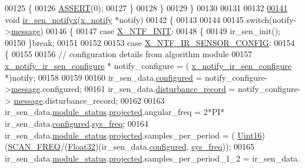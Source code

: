 \begin{DoxyCode}
00125         \{
00126             \hyperlink{a00072_abb8ff8e213ac9f6fb21d2b968583b936}{ASSERT}(0);
00127         \}
00128     \}
00129 \}
00130 
00131 
00132 
\hypertarget{a00045_source_l00141}{}\hyperlink{a00045_a36c6c2cdf9aa5844371e742330789dad}{00141} \textcolor{keywordtype}{void} \hyperlink{a00045_a36c6c2cdf9aa5844371e742330789dad}{ir\_sen\_notifyx}(\hyperlink{a00036_df/d4c/a00851}{x\_notify} *notify)
00142 \{
00143 
00144 
00145     \textcolor{keywordflow}{switch}(notify->\hyperlink{a00036_adf9665938515a20c283eea2c978cf80d}{message})
00146     \{
00147         \textcolor{keywordflow}{case} \hyperlink{a00036_a620b808f2d7b8d2a03c4d026a4c5423c}{X\_NTF\_INIT}:
00148         \{
00149             ir\_sen\_init();
00150         \}\textcolor{keywordflow}{break};
00151 
00152 
00153         \textcolor{keywordflow}{case} \hyperlink{a00017_abb12b7d6a5f3479f552b928bb008d7cd}{X\_NTF\_IR\_SENSOR\_CONFIG}:
00154         \{
00155 
00156             \textcolor{comment}{// configuration details from algorithm module}
00157             \hyperlink{a00017_d9/dbb/a00852}{x\_notify\_ir\_sen\_configure} * notify\_configure = (
      \hyperlink{a00017_d9/dbb/a00852}{x\_notify\_ir\_sen\_configure} *)notify;
00158 
00159 
00160             ir\_sen\_data.\hyperlink{a00023_a94b2d1f6ea4ab334c74d24984dd27843}{configured} = notify\_configure->\hyperlink{a00017_a466ed85f7086376a698e191f74f9a0bc}{message}.configured;
00161             ir\_sen\_data.\hyperlink{a00023_ac9b38e2c1d3f1013a88d33506c754152}{disturbance\_record} = notify\_configure->
      \hyperlink{a00017_a466ed85f7086376a698e191f74f9a0bc}{message}.disturbance\_record;
00162 
00163            ir\_sen\_data.\hyperlink{a00023_a5a53c391562b059eb744ac679f3765ca}{module\_status}.\hyperlink{a00017_a6b2516d74583418cec324c50041421c9}{projected}.angular\_freq             = 2*PI*
      ir\_sen\_data.\hyperlink{a00023_a94b2d1f6ea4ab334c74d24984dd27843}{configured}.\hyperlink{a00021_aa57be45aa1320405a885474010159c9e}{sys\_freq};
00164            ir\_sen\_data.\hyperlink{a00023_a5a53c391562b059eb744ac679f3765ca}{module\_status}.\hyperlink{a00017_a6b2516d74583418cec324c50041421c9}{projected}.samples\_per\_period       = (
      \hyperlink{a00072_a59a9f6be4562c327cbfb4f7e8e18f08b}{Uint16})(\hyperlink{a00021_a8127170b687c1f67a968886c128e76e4}{SCAN\_FREQ}/(\hyperlink{a00072_a87d38f886e617ced2698fc55afa07637}{Float32})(ir\_sen\_data.\hyperlink{a00023_a94b2d1f6ea4ab334c74d24984dd27843}{configured}.
      \hyperlink{a00021_aa57be45aa1320405a885474010159c9e}{sys\_freq}));
00165            ir\_sen\_data.\hyperlink{a00023_a5a53c391562b059eb744ac679f3765ca}{module\_status}.\hyperlink{a00017_a6b2516d74583418cec324c50041421c9}{projected}.samples\_per\_period\_1\_2  = ir\_sen\_data.

\end{DoxyCode}
